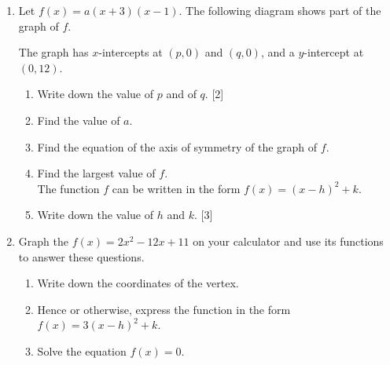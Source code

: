 \documentclass[12pt, twoside]{article}
\begin{document}
\begin{enumerate}
\newpage
\item Let $f(x)=a(x+3)(x-1)$. The following diagram shows part of the graph of $f$.
\begin{center}
\end{center}
The graph has $x$-intercepts at $(p,0)$ and $(q,0)$, and a $y$-intercept at $(0,12)$.
\begin{enumerate}%
  \item Write down the value of $p$ and of $q$. \hfill [2]
  \item Find the value of $a$.
  \item Find the equation of the axis of symmetry of the graph of $f$.
  \item Find the largest value of $f$. \\[0.25cm]
  The function $f$ can be written in the form $f(x)=(x-h)^2 +k$.
  \item Write down the value of $h$ and $k$. \hfill [3]
\end{enumerate}

\newpage
\item Graph the $f(x)=2x^2-12x+11$ on your calculator and use its functions to answer these questions. 
\begin{enumerate}[itemsep=1cm]
    \item Write down the coordinates of the vertex.
    \item Hence or otherwise, express the function in the form $f(x)=3(x-h)^2 +k$.
    \item Solve the equation  $f(x)=0$.
\end{enumerate} \vspace{0.5cm}


\end{enumerate}
\end{document}
